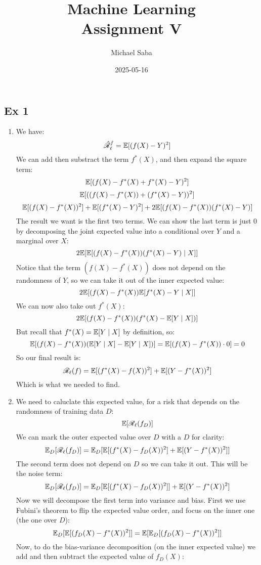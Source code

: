 \documentclass[12pt]{article}
\title{
    \Huge Machine Learning \\
    \Large Assignment V
}
\date{2025-05-16}
\author{Michael Saba}
\begin{document}
\maketitle
\newpage
\setlength{\parindent}{0pt}

\subsection*{Ex 1}

\begin{enumerate}[label = \letters]
\item 
We have:
\[ \hat{\mathscr{R}}_{\ell}^{f} = \mathbb{E}[(f(X) - Y)^2] \]
We can add then substract the term $f^*(X)$,
and then expand the square term:
\[ \mathbb{E}[(f(X)- f^*(X) + f^*(X) - Y)^2] \]
\[ \mathbb{E}[((f(X)- f^*(X)) + (f^*(X) - Y))^2] \]
\[ \mathbb{E}[(f(X)- f^*(X))^2]
+ \mathbb{E}[(f^*(X) - Y)^2]
+ 2\mathbb{E}[(f(X)- f^*(X))(f^*(X) - Y)] \]
The result we want is the first two terms.
We can show the last term is just $0$
by decomposing the joint expected value into
a conditional over $Y$ and a marginal over $X$:
\[ 2\mathbb{E}[\mathbb{E}[(f(X)- f^*(X))(f^*(X) - Y) \mid X ]] \]
Notice that the term $(f(X)- f^*(X))$
does not depend on the randomness of $Y$,
so we can take it out of the inner expected value:
\[ 2\mathbb{E}[(f(X)- f^*(X))\mathbb{E}[f^*(X) - Y \mid X ]] \]
We can now also take out $f^*(X)$:
\[ 2\mathbb{E}[(f(X)- f^*(X)) (f^*(X) - \mathbb{E}[Y \mid X ])] \]
But recall that $f^*(X) = \mathbb{E}[Y \mid X ]$
by definition, so:
\[ \mathbb{E}[(f(X)- f^*(X)) ( \mathbb{E}[Y \mid X ] - \mathbb{E}[Y \mid X ])]
= \mathbb{E}[(f(X)- f^*(X)) \cdot 0 ] = 0 \]
So our final result is:
\[  \mathscr{R}_{\ell}(f) =  \mathbb{E}[(f^*(X) - f(X))^2]
+ \mathbb{E}[(Y - f^*(X))^2] \]
Which is what we needed to find.
\item
We need to caluclate this expected value,
for a risk that depends on the randomness of training
data $D$:
\[ \mathbb{E}[\mathscr{R}_{\ell}(f_D)] \]
We can mark the outer expected value over $D$
with a $D$ for clarity:
\[ \mathbb{E}_D[\mathscr{R}_{\ell}(f_D)] 
= \mathbb{E}_D[\mathbb{E}[(f^*(X) - f_D(X))^2] + \mathbb{E}[(Y - f^*(X))^2]] \]
The second term does not depend on $D$
so we can take it out. This will be the noise term:
\[ \mathbb{E}_D[\mathscr{R}_{\ell}(f_D)] 
= \mathbb{E}_D[\mathbb{E}[(f^*(X) - f_D(X))^2]] + \mathbb{E}[(Y - f^*(X))^2] \]
Now we will decompose the first term into
variance and bias. First we use Fubini's theorem
to flip the expected value order,
and focus on the inner one (the one over $D$):
\[\mathbb{E}_D[\mathbb{E}[(f_D(X) - f^*(X))^2]] 
= \mathbb{E}[\mathbb{E}_D[(f_D(X) - f^*(X))^2]] \]
Now, to do the bias-variance decomposition
(on the inner expected value)
we add and then subtract the expected value of $f_D(X)$:

\end{enumerate}
\end{document}
